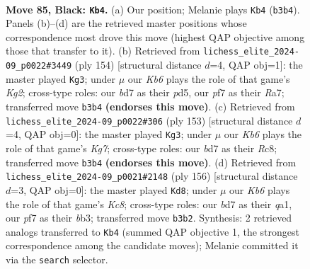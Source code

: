 \documentclass[11pt]{article}
\begin{document}
\clearpage

\begin{figure}[p]\centering
\begin{subfigure}{0.46\textwidth}\centering
\resizebox{\linewidth}{!}{%
\newchessgame
\chessboard[
  setfen={R7/3B1P2/8/7P/8/1k6/8/6K1 b - - 2 85},
  showmover=false,
  pgfstyle=straightmove, color=movearrow, markmove={b3-b4}
]}
\caption{}
\end{subfigure}\hfill
\begin{subfigure}{0.46\textwidth}\centering
\resizebox{\linewidth}{!}{%
\newchessgame
\chessboard[
  setfen={8/R7/8/3p4/8/3k4/6K1/2r5 w - - 41 78},
  showmover=false,
  pgfstyle=straightmove, color=movearrow, markmove={g2-g3}
]}
\caption{}
\end{subfigure}
\\[4pt]
\begin{subfigure}{0.46\textwidth}\centering
\resizebox{\linewidth}{!}{%
\newchessgame
\chessboard[
  setfen={2r5/8/8/5K1P/3R4/8/6k1/8 b - - 2 77},
  showmover=false,
  pgfstyle=straightmove, color=movearrow, markmove={g2-g3}
]}
\caption{}
\end{subfigure}\hfill
\begin{subfigure}{0.46\textwidth}\centering
\resizebox{\linewidth}{!}{%
\newchessgame
\chessboard[
  setfen={2K5/8/2k5/8/5p1p/1b6/8/q7 w - - 0 79},
  showmover=false,
  pgfstyle=straightmove, color=movearrow, markmove={c8-d8}
]}
\caption{}
\end{subfigure}
\caption{\textbf{Move 85, Black: \texttt{Kb4}.} (a) Our position; Melanie plays \texttt{Kb4} (\texttt{b3b4}). Panels (b)--(d) are the retrieved master positions whose correspondence most drove this move (highest QAP objective among those that transfer to it). (b) Retrieved from \texttt{lichess\_elite\_2024-09\_p0022\#3449} (ply 154) [structural distance $d$=4, QAP obj=1]: the master played \texttt{Kg3}; under $\mu$ our \emph{Kb6} plays the role of that game's \emph{Kg2}; cross-type roles: our \emph{b}d7 as their \emph{p}d5, our \emph{p}f7 as their \emph{R}a7; transferred move \texttt{b3b4} \textbf{(endorses this move)}. (c) Retrieved from \texttt{lichess\_elite\_2024-09\_p0022\#306} (ply 153) [structural distance $d$=4, QAP obj=0]: the master played \texttt{Kg3}; under $\mu$ our \emph{Kb6} plays the role of that game's \emph{Kg7}; cross-type roles: our \emph{b}d7 as their \emph{R}c8; transferred move \texttt{b3b4} \textbf{(endorses this move)}. (d) Retrieved from \texttt{lichess\_elite\_2024-09\_p0021\#2148} (ply 156) [structural distance $d$=3, QAP obj=0]: the master played \texttt{Kd8}; under $\mu$ our \emph{Kb6} plays the role of that game's \emph{Kc8}; cross-type roles: our \emph{b}d7 as their \emph{q}a1, our \emph{p}f7 as their \emph{b}b3; transferred move \texttt{b3b2}. Synthesis: 2 retrieved analogs transferred to \texttt{Kb4} (summed QAP objective 1, the strongest correspondence among the candidate moves); Melanie committed it via the \texttt{search} selector.}
\label{fig:thought-m169}
\end{figure}
\end{document}
